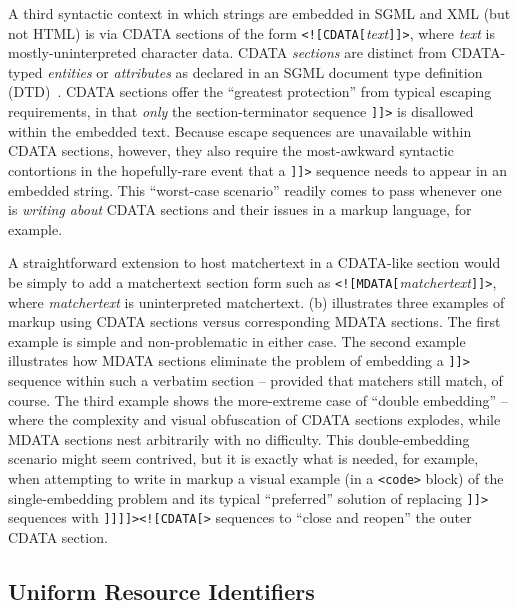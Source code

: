 A third syntactic context in which strings are embedded in SGML and XML
(but not HTML)
is via CDATA sections of the form \verb|<![CDATA[|\emph{text}\verb|]]>|,
where \emph{text} is mostly-uninterpreted character data.
CDATA \emph{sections} are distinct from
CDATA-typed \emph{entities} or \emph{attributes}
as declared in an SGML document type definition (DTD)~\cite{english97cdata}.
CDATA sections offer the ``greatest protection''
from typical \ml escaping requirements,
in that \emph{only} the section-terminator sequence \verb|]]>|
is disallowed within the embedded text.
Because \ml escape sequences are unavailable within CDATA sections, however,
they also require the most-awkward syntactic contortions
in the hopefully-rare event that a \verb|]]>| sequence
needs to appear in an embedded string.
This ``worst-case scenario'' readily comes to pass
whenever one is \emph{writing about} CDATA sections and their issues
in a \ml markup language, for example.

A straightforward extension to host matchertext in a CDATA-like section
would be simply to add a matchertext section form
such as \verb|<![MDATA[|\emph{matchertext}\verb|]]>|,
where \emph{matchertext} is uninterpreted matchertext.
(b) illustrates three examples of markup
using CDATA sections versus corresponding MDATA sections.
The first example is simple and non-problematic in either case.
The second example illustrates how MDATA sections eliminate the problem
of embedding a \verb|]]>| sequence within such a verbatim section --
provided that matchers still match, of course.
The third example shows the more-extreme case of ``double embedding'' --
where the complexity and visual obfuscation of CDATA sections explodes,
while MDATA sections nest arbitrarily with no difficulty.
This double-embedding scenario might seem contrived,
but it is exactly what is needed, for example,
when attempting to write in \ml markup a visual example
(\eg in a \verb|<code>| block)
of the single-embedding problem and its typical ``preferred'' solution
of replacing \verb|]]>| sequences with \verb|]]]]><![CDATA[>| sequences
to ``close and reopen'' the outer CDATA section.



\subsection{Uniform Resource Identifiers}
\label{sec:host:uri}

